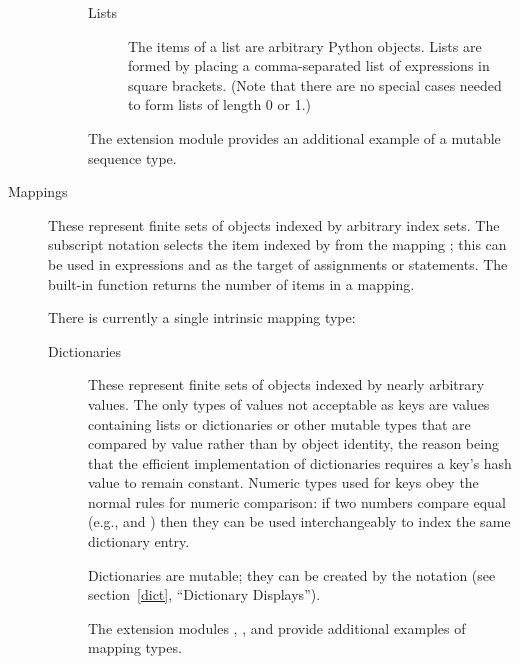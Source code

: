 \begin{description}
\begin{description}
\begin{description}

\item[Lists]
The items of a list are arbitrary Python objects.  Lists are formed
by placing a comma-separated list of expressions in square brackets.
(Note that there are no special cases needed to form lists of length 0
or 1.)

\end{description} %

The extension module  provides an
additional example of a mutable sequence type.


\end{description} %

\item[Mappings]
These represent finite sets of objects indexed by arbitrary index sets.
The subscript notation  selects the item indexed
by  from the mapping ; this can be used in
expressions and as the target of assignments or  statements.
The built-in function  returns the number of items
in a mapping.

There is currently a single intrinsic mapping type:

\begin{description}

\item[Dictionaries]
These represent finite sets of objects indexed by
nearly arbitrary values.  The only types of values not acceptable as
keys are values containing lists or dictionaries or other mutable
types that are compared by value rather than by object identity, the
reason being that the efficient implementation of dictionaries
requires a key's hash value to remain constant.
Numeric types used for keys obey the normal rules for numeric
comparison: if two numbers compare equal (e.g.,  and
) then they can be used interchangeably to index the same
dictionary entry.

Dictionaries are mutable; they can be created by the
 notation (see section~\ref{dict}, ``Dictionary
Displays'').

The extension modules ,
, and
 provide additional examples of
mapping types.

\end{description} %


\end{description}
